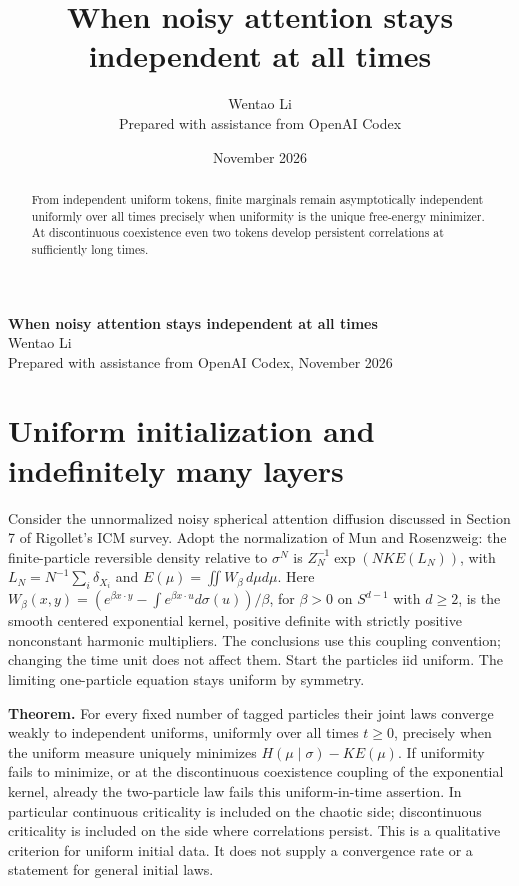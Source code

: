 \documentclass[10pt]{article}
\title{When noisy attention stays independent at all times}
\author{Wentao Li\\{\small Prepared with assistance from OpenAI Codex}}
\date{November 2026}
\begin{document}
\begin{center}{\Large\bfseries When noisy attention stays independent at all times}\\[3pt]Wentao Li\\{\small Prepared with assistance from OpenAI Codex, November 2026}\end{center}
\begin{abstract}
From independent uniform tokens, finite marginals remain asymptotically independent uniformly over all times precisely when uniformity is the unique free-energy minimizer. At discontinuous coexistence even two tokens develop persistent correlations at sufficiently long times.
\end{abstract}
\section*{Uniform initialization and indefinitely many layers}
Consider the unnormalized noisy spherical attention diffusion discussed in Section 7 of Rigollet's ICM survey. Adopt the normalization of Mun and Rosenzweig: the finite-particle reversible density relative to $\sigma^N$ is $Z_N^{-1}\exp(NK E(L_N))$, with $L_N=N^{-1}\sum_i\delta_{X_i}$ and $E(\mu)=\iint W_\beta\,d\mu d\mu$. Here $W_\beta(x,y)=(e^{\beta x\cdot y}-\int e^{\beta x\cdot u}d\sigma(u))/\beta$, for $\beta>0$ on $S^{d-1}$ with $d\ge2$, is the smooth centered exponential kernel, positive definite with strictly positive nonconstant harmonic multipliers. The conclusions use this coupling convention; changing the time unit does not affect them. Start the particles iid uniform. The limiting one-particle equation stays uniform by symmetry.

\textbf{Theorem.} For every fixed number of tagged particles their joint laws converge weakly to independent uniforms, uniformly over all times $t\ge0$, precisely when the uniform measure uniquely minimizes $H(\mu\mid\sigma)-K E(\mu)$. If uniformity fails to minimize, or at the discontinuous coexistence coupling of the exponential kernel, already the two-particle law fails this uniform-in-time assertion. In particular continuous criticality is included on the chaotic side; discontinuous criticality is included on the side where correlations persist. This is a qualitative criterion for uniform initial data. It does not supply a convergence rate or a statement for general initial laws.
\end{document}
